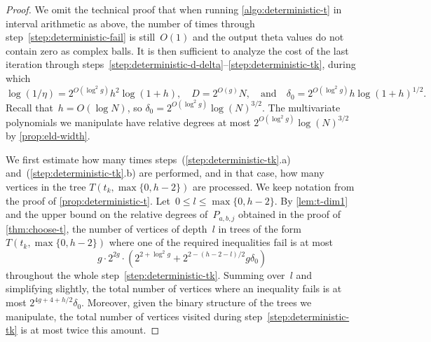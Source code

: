 \documentclass[12pt,oneside]{amsart}
\numberwithin{equation}{section}
\theoremstyle{definition}
\begin{document}
\begin{proof}
  We omit the technical proof that when running \cref{algo:deterministic-t} in
  interval arithmetic as above, the number of times through
  step~\eqref{step:deterministic-fail} is still~$O(1)$ and the output theta
  values do not contain zero as complex balls.  It is then sufficient to
  analyze the cost of the last iteration through
  steps~\eqref{step:deterministic-d-delta}--\eqref{step:deterministic-tk},
  during which
  \begin{displaymath}
    \log(1/\eta) = 2^{O(\log^2 g)} h^2 \log(1+h), \quad D = 2^{O(g)} N, \quad \text{and}\quad
    \delta_0 = 2^{O(\log^2 g)} h \log(1+h)^{1/2}.
  \end{displaymath}
  Recall that~$h = O(\log N)$, so $\delta_0 = 2^{O(\log^2 g)}
  \log(N)^{3/2}$. The multivariate polynomials we manipulate have
  relative degrees at most $2^{O(\log^2 g)}\log(N)^{3/2}$ by
  \cref{prop:eld-width}.

  We first estimate how many times steps~(\ref{step:deterministic-tk}.a)
  and~(\ref{step:deterministic-tk}.b) are performed, and in that case, how many
  vertices in the tree $T(t_k,\max\{0,h-2\})$ are processed. We keep notation
  from the proof of \cref{prop:deterministic-t}.
  Let~$0\leq l\leq \max\{0,h-2\}$. By \cref{lem:t-dim1} and the upper bound on
  the relative degrees of~$P_{a,b,j}$ obtained in the proof of
  \cref{thm:choose-t}, the number of vertices of depth~$l$ in trees of the
  form~$T(t_k, \max\{0,h-2\})$ where one of the required inequalities fail is at most
  \begin{displaymath}
    g\cdot 2^{2g} \cdot (2^{2 + \log^2 g} + 2^{2 - (h-2-l)/2} g\delta_0)
  \end{displaymath}
  throughout the whole step~\eqref{step:deterministic-tk}. Summing over~$l$ and
  simplifying slightly, the total number of vertices where an inequality fails
  is at most $2^{4g + 4 + h/2} \delta_0$.  Moreover, given the binary structure
  of the trees we manipulate, the total number of vertices visited during
  step~\eqref{step:deterministic-tk} is at most twice this amount.


\end{proof}
\end{document}
